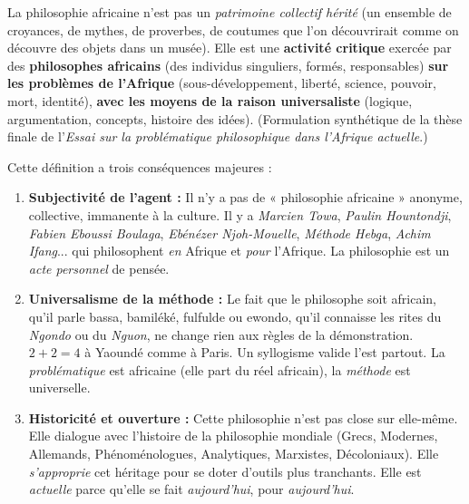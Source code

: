 \documentclass[11pt]{article}
\begin{document}
\begin{aretenir}
\guillemotleft La philosophie africaine n'est pas un \emph{patrimoine collectif hérité} (un ensemble de croyances, de mythes, de proverbes, de coutumes que l'on découvrirait comme on découvre des objets dans un musée). Elle est une \textbf{activité critique} exercée par des \textbf{philosophes africains} (des individus singuliers, formés, responsables) \textbf{sur les problèmes de l'Afrique} (sous-développement, liberté, science, pouvoir, mort, identité), \textbf{avec les moyens de la raison universaliste} (logique, argumentation, concepts, histoire des idées). \guillemotright
(Formulation synthétique de la thèse finale de l'\emph{Essai sur la problématique philosophique dans l'Afrique actuelle}.)

Cette définition a trois conséquences majeures :
\begin{enumerate}
    \item \textbf{Subjectivité de l'agent :} Il n'y a pas de « philosophie africaine » anonyme, collective, immanente à la culture. Il y a \emph{Marcien Towa}, \emph{Paulin Hountondji}, \emph{Fabien Eboussi Boulaga}, \emph{Ebénézer Njoh-Mouelle}, \emph{Méthode Hebga}, \emph{Achim Ifang}... qui philosophent \emph{en} Afrique et \emph{pour} l'Afrique. La philosophie est un \emph{acte personnel} de pensée.
    \item \textbf{Universalisme de la méthode :} Le fait que le philosophe soit africain, qu'il parle bassa, bamiléké, fulfulde ou ewondo, qu'il connaisse les rites du \emph{Ngondo} ou du \emph{Nguon}, ne change rien aux règles de la démonstration. $2+2=4$ à Yaoundé comme à Paris. Un syllogisme valide l'est partout. La \emph{problématique} est africaine (elle part du réel africain), la \emph{méthode} est universelle.
    \item \textbf{Historicité et ouverture :} Cette philosophie n'est pas close sur elle-même. Elle dialogue avec l'histoire de la philosophie mondiale (Grecs, Modernes, Allemands, Phénoménologues, Analytiques, Marxistes, Décoloniaux). Elle \emph{s'approprie} cet héritage pour se doter d'outils plus tranchants. Elle est \emph{actuelle} parce qu'elle se fait \emph{aujourd'hui}, pour \emph{aujourd'hui}.
\end{enumerate}
\end{aretenir}
\end{document}
